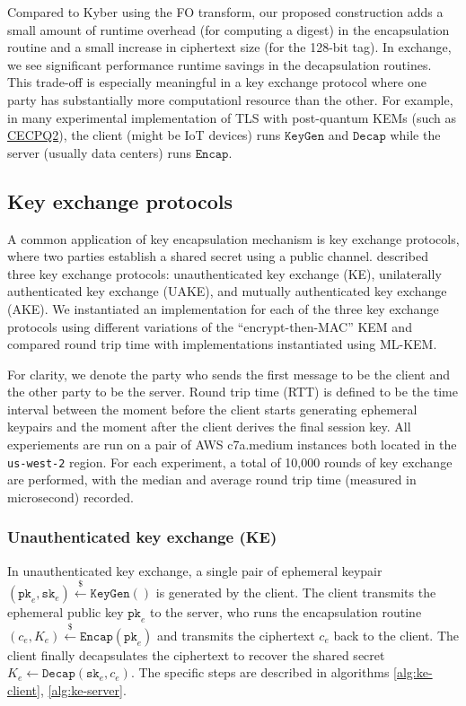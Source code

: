 \documentclass[floatrow,journal=tches,submission]{iacrtrans}
\newcommand{\keygen}{\texttt{KeyGen}}
\newcommand{\encap}{\texttt{Encap}}
\newcommand{\decap}{\texttt{Decap}}
\newcommand{\pk}{\texttt{pk}}
\newcommand{\sk}{\texttt{sk}}
\newcommand{\leftsample}{\stackrel{\$}{\leftarrow}}
\begin{document}
Compared to Kyber using the FO transform, our proposed construction adds a small amount of runtime overhead (for computing a digest) in the encapsulation routine and a small increase in ciphertext size (for the 128-bit tag). In exchange, we see significant performance runtime savings in the decapsulation routines. This trade-off is especially meaningful in a key exchange protocol where one party has substantially more computationl resource than the other. For example, in many experimental implementation of TLS with post-quantum KEMs (such as \href{https://blog.cloudflare.com/the-tls-post-quantum-experiment/}{CECPQ2}), the client (might be IoT devices) runs $\keygen$ and $\decap$ while the server (usually data centers) runs $\encap$.

\subsection{Key exchange protocols}\label{sec:key-exchange-protocols}
A common application of key encapsulation mechanism is key exchange protocols, where two parties establish a shared secret using a public channel. \cite{bos2018crystals} described three key exchange protocols: unauthenticated key exchange (KE), unilaterally authenticated key exchange (UAKE), and mutually authenticated key exchange (AKE). We instantiated an implementation for each of the three key exchange protocols using different variations of the ``encrypt-then-MAC'' KEM and compared round trip time with implementations instantiated using ML-KEM.

For clarity, we denote the party who sends the first message to be the client and the other party to be the server. Round trip time (RTT) is defined to be the time interval between the moment before the client starts generating ephemeral keypairs and the moment after the client derives the final session key. All experiements are run on a pair of AWS c7a.medium instances both located in the \texttt{us-west-2} region. For each experiment, a total of 10,000 rounds of key exchange are performed, with the median and average round trip time (measured in microsecond) recorded.

\subsubsection{Unauthenticated key exchange (KE)}\label{sec:unauthenticated-key-exchange}
In unauthenticated key exchange, a single pair of ephemeral keypair $(\pk_e, \sk_e) \leftsample \keygen()$ is generated by the client. The client transmits the ephemeral public key $\pk_e$ to the server, who runs the encapsulation routine $(c_e, K_e) \leftsample \encap(\pk_e)$ and transmits the ciphertext $c_e$ back to the client. The client finally decapsulates the ciphertext to recover the shared secret $K_e \leftarrow \decap(\sk_e, c_e)$. The specific steps are described in algorithms \ref{alg:ke-client}, \ref{alg:ke-server}.
\end{document}
